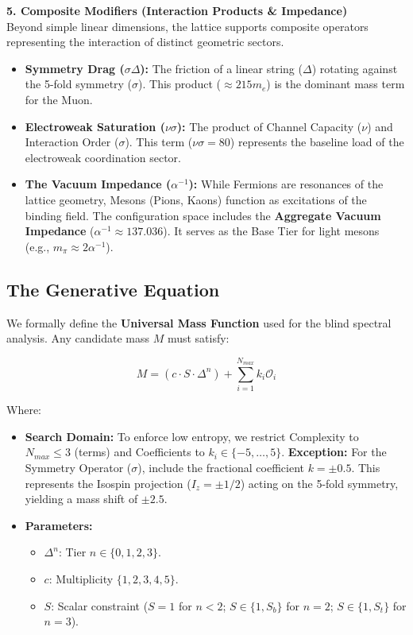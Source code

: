 \textbf{5. Composite Modifiers (Interaction Products \& Impedance)} \\
Beyond simple linear dimensions, the lattice supports composite operators representing the interaction of distinct geometric sectors.
\begin{itemize}
    \item \textbf{Symmetry Drag ($\sigma \Delta$):} The friction of a linear string ($\Delta$) rotating against the 5-fold symmetry ($\sigma$). This product ($\approx 215 m_e$) is the dominant mass term for the Muon.
    \item \textbf{Electroweak Saturation ($\nu \sigma$):} The product of Channel Capacity ($\nu$) and Interaction Order ($\sigma$). This term ($\nu\sigma = 80$) represents the baseline load of the electroweak coordination sector.
    \item \textbf{The Vacuum Impedance ($\alpha^{-1}$):} While Fermions are resonances of the lattice geometry, Mesons (Pions, Kaons) function as excitations of the binding field. The configuration space includes the \textbf{Aggregate Vacuum Impedance} ($\alpha^{-1} \approx 137.036$). It serves as the Base Tier for light mesons (e.g., $m_{\pi} \approx 2\alpha^{-1}$).
\end{itemize}

\subsection*{The Generative Equation}

We formally define the \textbf{Universal Mass Function} used for the blind spectral analysis. Any candidate mass $M$ must satisfy:

\[ M = \left( c \cdot S \cdot \Delta^n \right) + \sum_{i=1}^{N_{max}} k_i \mathcal{O}_i \]

Where:
\begin{itemize}
    \item \textbf{Search Domain:} To enforce low entropy, we restrict Complexity to $N_{max} \le 3$ (terms) and Coefficients to $k_i \in \{-5, \dots, 5\}$. \textbf{Exception:} For the Symmetry Operator ($\sigma$), include the fractional coefficient \textbf{$k = \pm 0.5$}. This represents the Isospin projection ($I_z = \pm 1/2$) acting on the 5-fold symmetry, yielding a mass shift of $\pm 2.5$.
    \item \textbf{Parameters:}
    \begin{itemize}
        \item $\Delta^n$: Tier $n \in \{0, 1, 2, 3\}$.
        \item $c$: Multiplicity $\{1, 2, 3, 4, 5\}$.
        \item $S$: Scalar constraint ($S=1$ for $n<2$; $S \in \{1, S_b\}$ for $n=2$; $S \in \{1, S_t\}$ for $n=3$).
    \end{itemize}
\end{itemize}